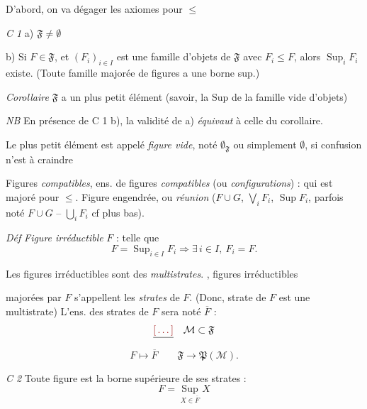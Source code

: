 \documentclass[11pt,a4paper]{article}
\begin{document}
D'abord, on va dégager les axiomes pour $\leq$

\emph{C 1} \quad a) $\mathfrak{F} \neq \emptyset$

\struck{\ill{}} b) Si $F \in \mathfrak{F}$, et $(F_i)_{i \in I}$ est une famille d'objets de $\mathfrak{F}$ avec $F_i \leq F$, alors $\operatorname{Sup}_i F_i$ existe. (Toute famille majorée de figures a une borne sup.)

\emph{Corollaire} \quad $\mathfrak{F}$ a un plus petit élément (savoir, la Sup de la famille vide d'objets)

\emph{NB} \quad En présence de \struck{\ill{}} C 1 b), la validité de a) \emph{équivaut} à celle du corollaire.

Le plus petit élément est appelé \emph{figure vide}, noté $\emptyset_{\mathfrak{F}}$ ou simplement $\emptyset$, \ill{} si confusion n'est à craindre


Figures \emph{compatibles}, ens. de figures \emph{compatibles}   (ou \emph{configurations}) : qui est majoré pour $\leq$. Figure engendrée, ou \emph{réunion} ($F \cup G$, $\bigvee_i F_i$, $\operatorname{Sup} F_i$, parfois noté $F \cup G$ -- $\bigcup_i F_i$ cf plus bas).

\emph{Déf} \quad \emph{Figure irréductible} $F$ : telle que
\[
  F = \operatorname{Sup}_{i \in I} F_i \Longrightarrow \exists\, i \in I, \ F_i = F .
\]

 Les figures irréductibles sont  des \emph{multistrates}. ,  figures irréductibles

majorées par $F$ s'appellent les \emph{strates} de $F$. (Donc, \struck{\ill{}} strate de $F$ est une multistrate) L'ens. des strates de $F$  sera noté $\overline{F}$ :
\[
  \struck{\ill{}} \quad \mathcal{M} \subset \mathfrak{F}
\]
\[
  F \mapsto \overline{F} \qquad \mathfrak{F} \to \mathfrak{P}(\mathcal{M}) .
\]

\emph{C 2} \quad Toute figure est la borne supérieure de ses strates :
\[
  F = \operatorname*{Sup}_{X \in \overline{F}} X
\]
\end{document}
